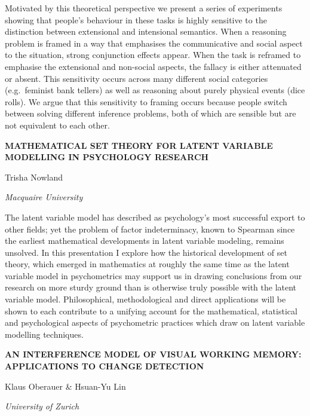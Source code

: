 \documentclass[]{article}
\begin{document}
Motivated by this theoretical perspective we present a series of
experiments showing that people's behaviour in these tasks is highly
sensitive to the distinction between extensional and intensional
semantics. When a reasoning problem is framed in a way that emphasises
the communicative and social aspect to the situation, strong conjunction
effects appear. When the task is reframed to emphasise the extensional
and non-social aspects, the fallacy is either attenuated or absent. This
sensitivity occurs across many different social categories
(e.g.~feminist bank tellers) as well as reasoning about purely physical
events (dice rolls). We argue that this sensitivity to framing occurs
because people switch between solving different inference problems, both
of which are sensible but are not equivalent to each other.

\textbf{MATHEMATICAL SET THEORY FOR LATENT VARIABLE MODELLING IN
PSYCHOLOGY RESEARCH}

Trisha Nowland

\emph{Macquaire University}

The latent variable model has described as psychology's most successful
export to other fields; yet the problem of factor indeterminacy, known
to Spearman since the earliest mathematical developments in latent
variable modeling, remains unsolved. In this presentation I explore how
the historical development of set theory, which emerged in mathematics
at roughly the same time as the latent variable model in psychometrics
may support us in drawing conclusions from our research on more sturdy
ground than is otherwise truly possible with the latent variable model.
Philosophical, methodological and direct applications will be shown to
each contribute to a unifying account for the mathematical, statistical
and psychological aspects of psychometric practices which draw on latent
variable modelling techniques.

\textbf{AN INTERFERENCE MODEL OF VISUAL WORKING MEMORY: APPLICATIONS TO
CHANGE DETECTION}

Klaus Oberauer \& Hsuan-Yu Lin

\emph{University of Zurich}
\end{document}
